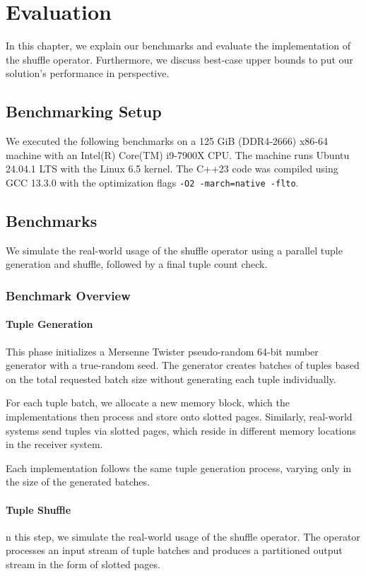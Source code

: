 
\chapter{Evaluation}\label{chapter:evaluation}\acresetall
In this chapter, we explain our benchmarks and evaluate the implementation of the shuffle operator.
Furthermore, we discuss best-case upper bounds to put our solution's performance in perspective.
\section{Benchmarking Setup}\label{section-benchmarking-setup}
We executed the following benchmarks on a 125 GiB (DDR4-2666) x86-64 machine with an Intel(R) Core(TM) i9-7900X CPU.
The machine runs Ubuntu 24.04.1 LTS with the Linux 6.5 kernel.
The C++23 code was compiled using GCC 13.3.0 with the optimization flags \texttt{-O2 -march=native -flto}.

\section{Benchmarks}
We simulate the real-world usage of the shuffle operator using a parallel tuple generation and shuffle, followed by a final tuple count check.

\subsection{Benchmark Overview}
\subsubsection{Tuple Generation}
This phase initializes a Mersenne Twister pseudo-random 64-bit number generator with a true-random seed.
The generator creates batches of tuples based on the total requested batch size without generating each tuple individually.

For each tuple batch, we allocate a new memory block, which the implementations then process and store onto slotted pages.
Similarly, real-world systems send tuples via slotted pages, which reside in different memory locations in the receiver system.

Each implementation follows the same tuple generation process, varying only in the size of the generated batches.
\subsubsection{Tuple Shuffle}
n this step, we simulate the real-world usage of the shuffle operator.
The operator processes an input stream of tuple batches and produces a partitioned output stream in the form of slotted pages.


